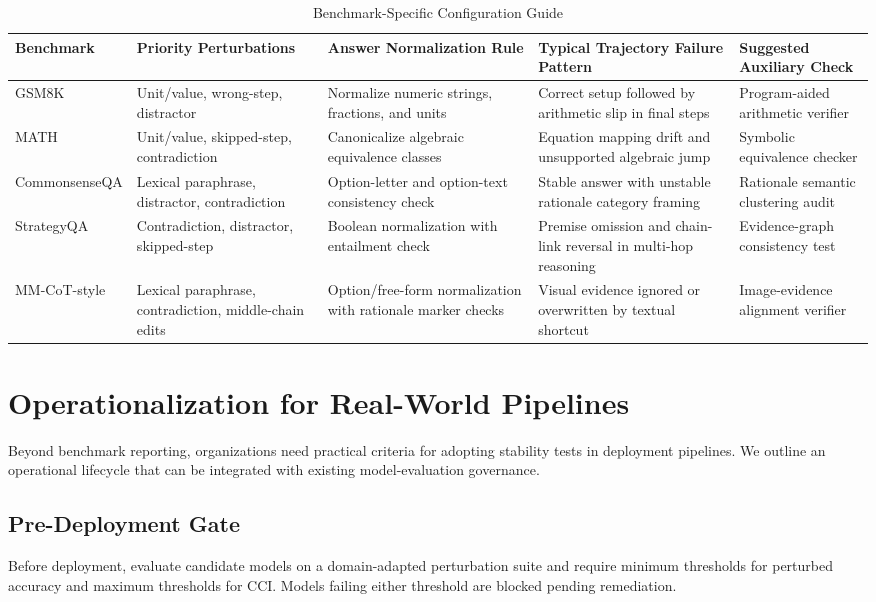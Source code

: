 \documentclass[conference]{IEEEtran}
\begin{document}
\begin{table}[!t]
\caption{Benchmark-Specific Configuration Guide}
\label{tab:benchmark-recipes}
\centering
\begin{tabular}{p{1.8cm}p{2.4cm}p{3.8cm}p{3.9cm}p{2.9cm}}
\toprule
Benchmark & Priority Perturbations & Answer Normalization Rule & Typical Trajectory Failure Pattern & Suggested Auxiliary Check \\
\midrule
GSM8K & Unit/value, wrong-step, distractor & Normalize numeric strings, fractions, and units & Correct setup followed by arithmetic slip in final steps & Program-aided arithmetic verifier \\
MATH & Unit/value, skipped-step, contradiction & Canonicalize algebraic equivalence classes & Equation mapping drift and unsupported algebraic jump & Symbolic equivalence checker \\
CommonsenseQA & Lexical paraphrase, distractor, contradiction & Option-letter and option-text consistency check & Stable answer with unstable rationale category framing & Rationale semantic clustering audit \\
StrategyQA & Contradiction, distractor, skipped-step & Boolean normalization with entailment check & Premise omission and chain-link reversal in multi-hop reasoning & Evidence-graph consistency test \\
MM-CoT-style & Lexical paraphrase, contradiction, middle-chain edits & Option/free-form normalization with rationale marker checks & Visual evidence ignored or overwritten by textual shortcut & Image-evidence alignment verifier \\
\bottomrule
\end{tabular}
\end{table}

\section{Operationalization for Real-World Pipelines}
Beyond benchmark reporting, organizations need practical criteria for adopting stability tests in deployment pipelines. We outline an operational lifecycle that can be integrated with existing model-evaluation governance.

\subsection{Pre-Deployment Gate}
Before deployment, evaluate candidate models on a domain-adapted perturbation suite and require minimum thresholds for perturbed accuracy and maximum thresholds for CCI. Models failing either threshold are blocked pending remediation.
\end{document}
